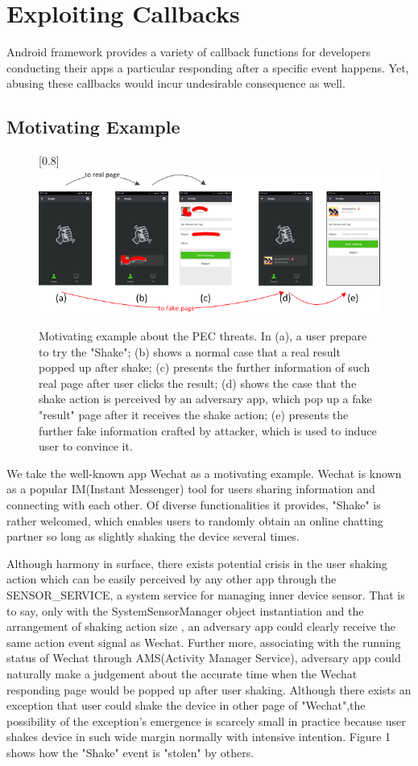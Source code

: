 \section{Exploiting Callbacks}
Android framework provides a variety of callback functions for developers conducting their apps a particular responding after a specific event happens. Yet, abusing these callbacks would incur undesirable consequence as well.
\subsection{Motivating Example}

\begin{figure}[t]
\centering
\scalebox{1}[0.8]{\includegraphics{pic1.png}}
\caption{\label{} Motivating example about the PEC threats. In (a), a user prepare to try the "Shake"; (b) shows a normal case that a real result popped up after shake; (c) presents the further information of such real page after user clicks the result; (d) shows the case that the shake action is perceived by an adversary app, which pop up a fake "result" page after it receives the shake action; (e) presents the further fake information crafted by attacker, which is used to induce user to convince it.}
\end{figure}

We take the well-known app Wechat as a motivating example. Wechat is known as a popular IM(Instant Messenger) tool for users sharing information and connecting with each other. Of diverse functionalities it provides, "Shake" is rather welcomed, which enables users to randomly obtain an online chatting partner so long as slightly shaking the device several times.

Although harmony in surface, there exists potential crisis in the user shaking action which can be easily perceived by any other app through the {\color{red}SENSOR\_SERVICE}, a system service for managing inner device sensor. That is to say, only with the {\color{red}SystemSensorManager} object instantiation and the arrangement of shaking action size , an adversary app could clearly receive the same action event signal as Wechat. Further more, associating with the running status of Wechat through {\color{red}AMS(Activity Manager Service)}, adversary app could naturally make a judgement about the accurate time when the Wechat responding page would be popped up after user shaking. Although there exists an exception that user could shake the device in other page of "Wechat",the possibility of the exception's emergence is scarcely small in practice because user shakes device in such wide margin normally with intensive intention. {\color{red}Figure 1} shows how the "Shake" event is "stolen" by others. 

